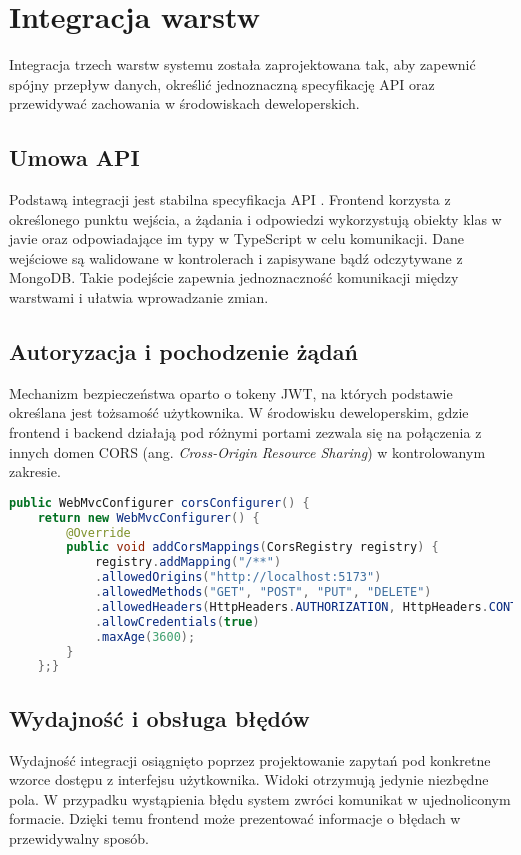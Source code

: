 \section{Integracja warstw}
Integracja trzech warstw systemu została zaprojektowana tak, aby zapewnić spójny przepływ danych, określić jednoznaczną specyfikację API oraz przewidywać zachowania w środowiskach deweloperskich.
\subsection*{Umowa API}
Podstawą integracji jest stabilna specyfikacja API \cite{API}. Frontend korzysta z określonego punktu wejścia, a żądania i odpowiedzi wykorzystują obiekty klas w javie oraz odpowiadające im typy w TypeScript w celu komunikacji. Dane wejściowe są walidowane w kontrolerach i zapisywane bądź odczytywane z MongoDB. Takie podejście zapewnia jednoznaczność komunikacji między warstwami i ułatwia wprowadzanie zmian. 
\subsection*{Autoryzacja i pochodzenie żądań}
Mechanizm bezpieczeństwa oparto o tokeny JWT, na których podstawie określana jest tożsamość użytkownika. W środowisku deweloperskim, gdzie frontend i backend działają pod różnymi portami zezwala się na połączenia z innych domen CORS (ang. \textit{Cross-Origin Resource Sharing}) w kontrolowanym zakresie.
\begin{lstlisting}[language={java}, caption={Konfiguracja CROS}, label={lst:Java-CROS}]
public WebMvcConfigurer corsConfigurer() {
	return new WebMvcConfigurer() {
		@Override
		public void addCorsMappings(CorsRegistry registry) {
			registry.addMapping("/**")
			.allowedOrigins("http://localhost:5173")
			.allowedMethods("GET", "POST", "PUT", "DELETE")
			.allowedHeaders(HttpHeaders.AUTHORIZATION, HttpHeaders.CONTENT_TYPE, HttpHeaders.ACCEPT)
			.allowCredentials(true)
			.maxAge(3600);
		}
	};}
\end{lstlisting}
\subsection*{Wydajność i obsługa błędów}
Wydajność integracji osiągnięto poprzez projektowanie zapytań pod konkretne wzorce dostępu z interfejsu użytkownika. Widoki otrzymują jedynie niezbędne pola. W przypadku wystąpienia błędu system zwróci komunikat w ujednoliconym formacie. Dzięki temu frontend może prezentować informacje o błędach w przewidywalny sposób.

